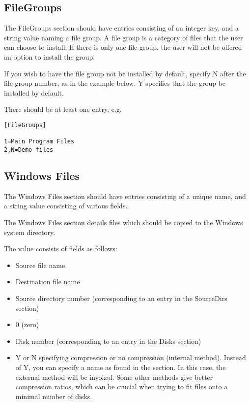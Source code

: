 \subsection{FileGroups}

The FileGroups section should have entries consisting of
an integer key, and a string value naming a file group.
A file group is a category of files that the user can choose to install.
If there is only one file group, the user will not be offered
an option to install the group.

If you wish to have the file group not be installed by default, specify
N after the file group number, as in the example below. Y specifies that
the group be installed by default.

There should be at least one entry, e.g.

\begin{verbatim}
[FileGroups] 

1=Main Program Files
2,N=Demo files
\end{verbatim}

\subsection{Windows Files}

The Windows Files section should have entries consisting of
a unique name, and a string value consisting of various fields.

The Windows Files section details files which should be copied
to the Windows system directory.

The value consists of fields as follows:

\begin{itemize}
\itemsep=0pt
\item Source file name
\item Destination file name
\item Source directory number (corresponding to an entry in the SourceDirs
section)
\item 0 (zero)
\item Disk number (corresponding to an entry in the Disks section)
\item Y or N specifying compression or no compression (internal method).
Instead of Y, you can specify a name as found in the  section.
In this case, the external method will be invoked. Some other methods give
better compression ratios, which can be crucial when trying to fit files
onto a minimal number of disks.
\end{itemize}

